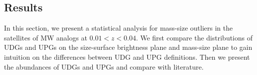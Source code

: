 \documentclass[twocolumn,astrosymb,twocolappendix]{aastex631}
\begin{document}
\begin{CJK*}{UTF8}{gbsn}


\section{Results}\label{sec:results}
In this section, we present a statistical analysis for mass-size outliers in the satellites of MW analogs at $0.01 < z < 0.04$. We first compare the distributions of UDGs and UPGs on the size-surface brightness plane and mass-size plane to gain intuition on the differences between UDG and UPG definitions. Then we present the abundances of UDGs and UPGs and compare with literature. 


\end{CJK*}
\end{document}
